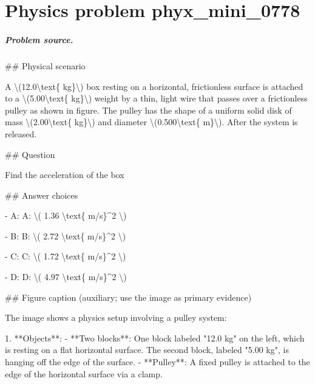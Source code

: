 
\chapter{Physics problem phyx\_mini\_0778}
\label{ch:PhyXMiniProblems_problem_phyx_mini_0778}

\paragraph{Problem source.}
\#\# Physical scenario

A \textbackslash{}(12.0\textbackslash{}text\{ kg\}\textbackslash{}) box resting on a horizontal, frictionless surface is attached to a \textbackslash{}(5.00\textbackslash{}text\{ kg\}\textbackslash{}) weight by a thin, light wire that passes over a frictionless pulley as shown in figure. The pulley has the shape of a uniform solid disk of mass \textbackslash{}(2.00\textbackslash{}text\{ kg\}\textbackslash{}) and diameter \textbackslash{}(0.500\textbackslash{}text\{ m\}\textbackslash{}). After the system is released.

\#\# Question

Find the acceleration of the box

\#\# Answer choices

- A: A: \textbackslash{}( 1.36 \textbackslash{}text\{ m/s\}\textasciicircum{}2 \textbackslash{})

- B: B: \textbackslash{}( 2.72 \textbackslash{}text\{ m/s\}\textasciicircum{}2 \textbackslash{})

- C: C: \textbackslash{}( 1.72 \textbackslash{}text\{ m/s\}\textasciicircum{}2 \textbackslash{})

- D: D: \textbackslash{}( 4.97 \textbackslash{}text\{ m/s\}\textasciicircum{}2 \textbackslash{})

\#\# Figure caption (auxiliary; use the image as primary evidence)

The image shows a physics setup involving a pulley system:

1. **Objects**:
   - **Two blocks**: One block labeled "12.0 kg" on the left, which is resting on a flat horizontal surface. The second block, labeled "5.00 kg", is hanging off the edge of the surface.
   - **Pulley**: A fixed pulley is attached to the edge of the horizontal surface via a clamp.
  
